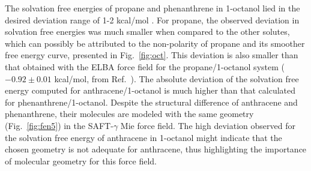 \documentclass[final,12p,times,twocolumn]{elsarticle}
\begin{document}
    The solvation free energies of propane and phenanthrene in 1-octanol lied in the desired deviation range of 1-2 kcal/mol \cite{doimobley}. For propane, the observed deviation in solvation free energies was much smaller when compared to the other solutes, which can possibly be attributed to the non-polarity of propane and its smoother free energy curve, presented in Fig.~\ref{fig:oct}. This deviation is also smaller than that obtained with the ELBA force field for the propane/1-octanol system ($-0.92 \pm 0.01$ kcal/mol, from Ref.~). The absolute deviation of the solvation free energy computed for anthracene/1-octanol is much higher than that calculated for phenanthrene/1-octanol. Despite the structural difference of anthracene and phenanthrene, their molecules are modeled with the same geometry (Fig.~\ref{fig:fen5}) in the SAFT-$\gamma$ Mie force field. The high deviation observed for the solvation free energy of anthracene in 1-octanol might indicate that the chosen geometry is not adequate for anthracene, thus highlighting the importance of molecular geometry for this force field.
\end{document}
